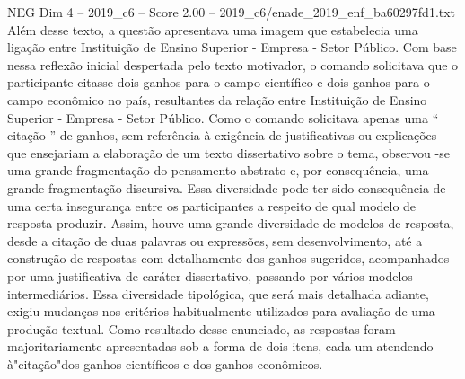 \begin{textsample}{NEG Dim 4 – 2019\_c6 – Score 2.00 – 2019\_c6/enade\_2019\_enf\_ba60297fd1.txt}
Além desse texto, a questão apresentava uma imagem que estabelecia uma ligação entre Instituição de Ensino Superior - Empresa - Setor Público.
Com base nessa reflexão inicial despertada pelo texto motivador, o comando solicitava que o participante citasse dois ganhos para o campo científico e dois ganhos para o campo econômico no país, resultantes da relação entre Instituição de Ensino Superior - Empresa - Setor Público.
Como o comando solicitava apenas uma “ citação ” de ganhos, sem referência à exigência de justificativas ou explicações que ensejariam a elaboração de um texto dissertativo sobre o tema, observou -se uma grande fragmentação do pensamento abstrato e, por consequência, uma grande fragmentação discursiva.
Essa diversidade pode ter sido consequência de uma certa insegurança entre os participantes a respeito de qual modelo de resposta produzir.
Assim, houve uma grande diversidade de modelos de resposta, desde a citação de duas palavras ou expressões, sem desenvolvimento, até a construção de respostas com detalhamento dos ganhos sugeridos, acompanhados por uma justificativa de caráter dissertativo, passando por vários modelos intermediários.
Essa diversidade tipológica, que será mais detalhada adiante, exigiu mudanças nos critérios habitualmente utilizados para avaliação de uma produção textual.
Como resultado desse enunciado, as respostas foram majoritariamente apresentadas sob a forma de dois itens, cada um atendendo à"citação"dos ganhos científicos e dos ganhos econômicos.

\end{textsample}
